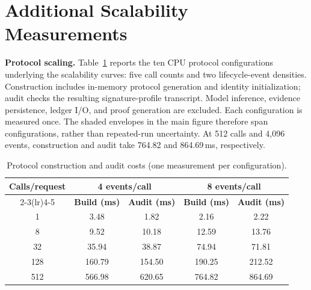 \section{Additional Scalability Measurements}
\label{app:b3-scalability}
\label{app:b3-concurrency}

\noindent\textbf{Protocol scaling.}
Table~\ref{tab:b3-protocol-scaling} reports the ten CPU protocol configurations
underlying the scalability curves: five call counts and two lifecycle-event
densities. Construction includes in-memory protocol generation and identity
initialization; audit checks the resulting signature-profile transcript.
Model inference, evidence persistence, ledger I/O, and proof generation are excluded.
Each configuration is measured once. The shaded envelopes in the main figure
therefore span configurations, rather than repeated-run uncertainty.
At 512 calls and 4,096 events, construction and audit take 764.82 and 864.69\,ms,
respectively.
\begin{table}[!t]
\centering
\caption{Protocol construction and audit costs (one measurement per configuration).}
\label{tab:b3-protocol-scaling}
\footnotesize
\renewcommand{\arraystretch}{1.10}
\begin{tabular*}{\textwidth}{@{\hspace{4pt}}c@{\extracolsep{\fill}}cccc@{\hspace{4pt}}}
\toprule
\textbf{Calls/request} & \multicolumn{2}{c}{\textbf{4 events/call}} & \multicolumn{2}{c}{\textbf{8 events/call}} \\
\cmidrule(lr){2-3}\cmidrule(lr){4-5}
 & \textbf{Build (ms)} & \textbf{Audit (ms)} & \textbf{Build (ms)} & \textbf{Audit (ms)} \\
\midrule
1 & 3.48 & 1.82 & 2.16 & 2.22 \\
8 & 9.52 & 10.18 & 12.59 & 13.76 \\
32 & 35.94 & 38.87 & 74.94 & 71.81 \\
128 & 160.79 & 154.50 & 190.25 & 212.52 \\
512 & 566.98 & 620.65 & 764.82 & 864.69 \\
\bottomrule
\end{tabular*}
\end{table}


